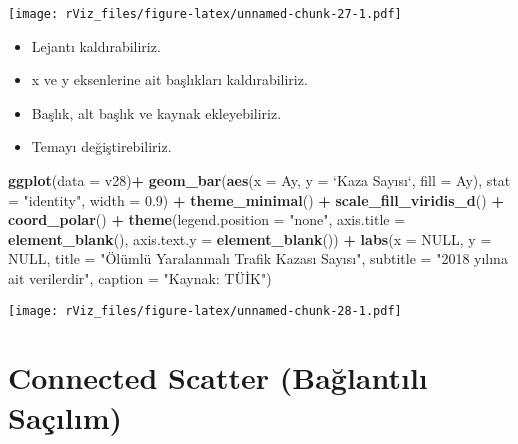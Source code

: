\documentclass[
]{book}
\newenvironment{Shaded}{\begin{snugshade}}{\end{snugshade}}
\newcommand{\DataTypeTok}[1]{\textcolor[rgb]{0.13,0.29,0.53}{#1}}
\newcommand{\FloatTok}[1]{\textcolor[rgb]{0.00,0.00,0.81}{#1}}
\newcommand{\KeywordTok}[1]{\textcolor[rgb]{0.13,0.29,0.53}{\textbf{#1}}}
\newcommand{\NormalTok}[1]{#1}
\newcommand{\OperatorTok}[1]{\textcolor[rgb]{0.81,0.36,0.00}{\textbf{#1}}}
\newcommand{\OtherTok}[1]{\textcolor[rgb]{0.56,0.35,0.01}{#1}}
\newcommand{\StringTok}[1]{\textcolor[rgb]{0.31,0.60,0.02}{#1}}
\begin{document}
\texttt{[image: rViz\_files/figure-latex/unnamed-chunk-27-1.pdf]}

\begin{itemize}
\item
  Lejantı kaldırabiliriz.
\item
  x ve y eksenlerine ait başlıkları kaldırabiliriz.
\item
  Başlık, alt başlık ve kaynak ekleyebiliriz.
\item
  Temayı değiştirebiliriz.
\end{itemize}

\begin{Shaded}
\begin{Highlighting}[]
\KeywordTok{ggplot}\NormalTok{(}\DataTypeTok{data =}\NormalTok{ v28)}\OperatorTok{+}
\StringTok{  }\KeywordTok{geom_bar}\NormalTok{(}\KeywordTok{aes}\NormalTok{(}\DataTypeTok{x =}\NormalTok{ Ay, }\DataTypeTok{y =} \StringTok{`}\DataTypeTok{Kaza Sayısı}\StringTok{`}\NormalTok{, }\DataTypeTok{fill =}\NormalTok{ Ay), }\DataTypeTok{stat =} \StringTok{"identity"}\NormalTok{, }\DataTypeTok{width =} \FloatTok{0.9}\NormalTok{) }\OperatorTok{+}
\StringTok{  }\KeywordTok{theme_minimal}\NormalTok{() }\OperatorTok{+}
\StringTok{  }\KeywordTok{scale_fill_viridis_d}\NormalTok{() }\OperatorTok{+}
\StringTok{  }\KeywordTok{coord_polar}\NormalTok{() }\OperatorTok{+}
\StringTok{  }\KeywordTok{theme}\NormalTok{(}\DataTypeTok{legend.position =} \StringTok{"none"}\NormalTok{,}
        \DataTypeTok{axis.title =} \KeywordTok{element_blank}\NormalTok{(),}
        \DataTypeTok{axis.text.y =} \KeywordTok{element_blank}\NormalTok{()) }\OperatorTok{+}
\StringTok{  }\KeywordTok{labs}\NormalTok{(}\DataTypeTok{x =} \OtherTok{NULL}\NormalTok{,}
       \DataTypeTok{y =} \OtherTok{NULL}\NormalTok{,}
       \DataTypeTok{title =} \StringTok{"Ölümlü Yaralanmalı Trafik Kazası Sayısı"}\NormalTok{,}
       \DataTypeTok{subtitle =} \StringTok{"2018 yılına ait verilerdir"}\NormalTok{,}
       \DataTypeTok{caption =} \StringTok{"Kaynak: TÜİK"}\NormalTok{)}
\end{Highlighting}
\end{Shaded}

\texttt{[image: rViz\_files/figure-latex/unnamed-chunk-28-1.pdf]}

\hypertarget{connected-scatter-baux11flantux131lux131-sauxe7ux131lux131m}{%
\section{Connected Scatter (Bağlantılı Saçılım)}\label{connected-scatter-baux11flantux131lux131-sauxe7ux131lux131m}}
\end{document}
